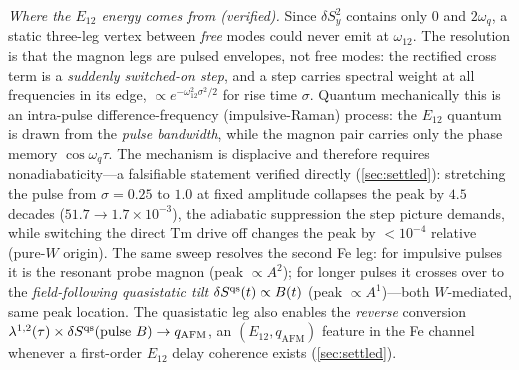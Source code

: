 \documentclass[11pt,a4paper]{article}
\begin{document}
\emph{Where the $E_{12}$ energy comes from (verified).}  Since $\delta S_y^2$
contains only $0$ and $2\omega_q$, a static three-leg vertex between \emph{free}
modes could never emit at $\omega_{12}$.  The resolution is that the magnon legs
are pulsed envelopes, not free modes: the rectified cross term is a
\emph{suddenly switched-on step}, and a step carries spectral weight at all
frequencies in its edge, $\propto e^{-\omega_{12}^2\sigma^2/2}$ for rise time
$\sigma$.  Quantum mechanically this is an intra-pulse difference-frequency
(impulsive-Raman) process: the $E_{12}$ quantum is drawn from the \emph{pulse
bandwidth}, while the magnon pair carries only the phase memory
$\cos\omega_q\tau$.  The mechanism is displacive and therefore requires
nonadiabaticity---a falsifiable statement verified directly
(\cref{sec:settled}): stretching the pulse from $\sigma=0.25$ to $1.0$ at
fixed amplitude collapses the peak by $4.5$ decades
($51.7\to1.7\times10^{-3}$), the adiabatic suppression the step picture
demands, while switching the direct Tm drive off changes the peak by
$<10^{-4}$ relative (pure-$W$ origin).  The same sweep resolves the second Fe
leg: for impulsive pulses it is the resonant probe magnon (peak $\propto
A^2$); for longer pulses it crosses over to the \emph{field-following
quasistatic tilt} $\delta S^{\rm qs}(t)\propto B(t)$ (peak $\propto A^1$)---both
$W$-mediated, same peak location.  The quasistatic leg also enables the
\emph{reverse} conversion
$\lambda^{1,2}(\tau)\times\delta S^{\rm qs}(\text{pulse }B)\to
q_{\mathrm{AFM}}$, an $(E_{12},q_{\mathrm{AFM}})$ feature in the Fe channel
whenever a first-order $E_{12}$ delay coherence exists
(\cref{sec:settled}).
\end{document}
